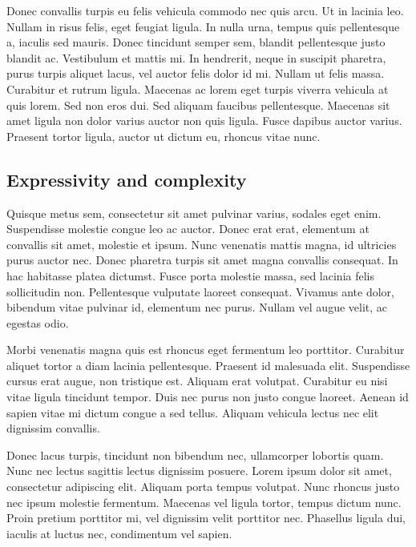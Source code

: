 Donec convallis turpis eu felis vehicula commodo nec quis arcu. Ut in lacinia leo. Nullam in risus felis, eget feugiat ligula. In nulla urna, tempus quis pellentesque a, iaculis sed mauris. Donec tincidunt semper sem, blandit pellentesque justo blandit ac. Vestibulum et mattis mi. In hendrerit, neque in suscipit pharetra, purus turpis aliquet lacus, vel auctor felis dolor id mi. Nullam ut felis massa. Curabitur et rutrum ligula. Maecenas ac lorem eget turpis viverra vehicula at quis lorem. Sed non eros dui. Sed aliquam faucibus pellentesque. Maecenas sit amet ligula non dolor varius auctor non quis ligula. Fusce dapibus auctor varius. Praesent tortor ligula, auctor ut dictum eu, rhoncus vitae nunc.

\subsection{Expressivity and complexity}

Quisque metus sem, consectetur sit amet pulvinar varius, sodales eget enim. Suspendisse molestie congue leo ac auctor. Donec erat erat, elementum at convallis sit amet, molestie et ipsum. Nunc venenatis mattis magna, id ultricies purus auctor nec. Donec pharetra turpis sit amet magna convallis consequat. In hac habitasse platea dictumst. Fusce porta molestie massa, sed lacinia felis sollicitudin non. Pellentesque vulputate laoreet consequat. Vivamus ante dolor, bibendum vitae pulvinar id, elementum nec purus. Nullam vel augue velit, ac egestas odio.

Morbi venenatis magna quis est rhoncus eget fermentum leo porttitor. Curabitur aliquet tortor a diam lacinia pellentesque. Praesent id malesuada elit. Suspendisse cursus erat augue, non tristique est. Aliquam erat volutpat. Curabitur eu nisi vitae ligula tincidunt tempor. Duis nec purus non justo congue laoreet. Aenean id sapien vitae mi dictum congue a sed tellus. Aliquam vehicula lectus nec elit dignissim convallis.

Donec lacus turpis, tincidunt non bibendum nec, ullamcorper lobortis quam. Nunc nec lectus sagittis lectus dignissim posuere. Lorem ipsum dolor sit amet, consectetur adipiscing elit. Aliquam porta tempus volutpat. Nunc rhoncus justo nec ipsum molestie fermentum. Maecenas vel ligula tortor, tempus dictum nunc. Proin pretium porttitor mi, vel dignissim velit porttitor nec. Phasellus ligula dui, iaculis at luctus nec, condimentum vel sapien.


